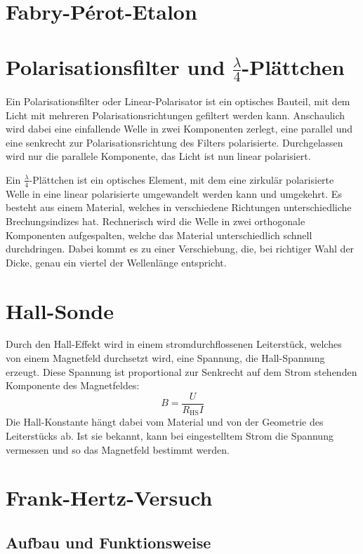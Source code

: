 \section{Fabry-Pérot-Etalon}

\section{Polarisationsfilter und $\frac{\lambda}4$-Plättchen}

Ein Polarisationsfilter oder Linear-Polarisator ist ein optisches Bauteil, mit
dem Licht mit mehreren Polarisationsrichtungen gefiltert werden kann.
Anschaulich wird dabei eine einfallende Welle in zwei Komponenten zerlegt, eine
parallel und eine senkrecht zur Polarisationsrichtung des Filters polarisierte.
Durchgelassen wird nur die parallele Komponente, das Licht ist nun linear
polarisiert.

Ein $\frac\lambda4$-Plättchen ist ein optisches Element, mit dem eine zirkulär
polarisierte Welle in eine linear polarisierte umgewandelt werden kann und
umgekehrt. Es besteht aus einem Material, welches in verschiedene Richtungen
unterschiedliche Brechungsindizes hat. Rechnerisch wird die Welle in zwei
orthogonale Komponenten aufgespalten, welche das Material unterschiedlich
schnell durchdringen. Dabei kommt es zu einer Verschiebung, die, bei richtiger
Wahl der Dicke, genau ein viertel der Wellenlänge entspricht.

\section{Hall-Sonde}

Durch den Hall-Effekt wird in einem stromdurchflossenen Leiterstück, welches
von einem Magnetfeld durchsetzt wird, eine Spannung, die Hall-Spannung erzeugt.
Diese Spannung ist proportional zur Senkrecht auf dem Strom stehenden
Komponente des Magnetfeldes:
\[
    B = \frac{U}{R_\text{HS}I}
\]
Die Hall-Konstante hängt dabei vom Material und von der Geometrie des
Leiterstücks ab. Ist sie bekannt, kann bei eingestelltem Strom die Spannung
vermessen und so das Magnetfeld bestimmt werden.

\section{Frank-Hertz-Versuch}

\subsection{Aufbau und Funktionsweise}

